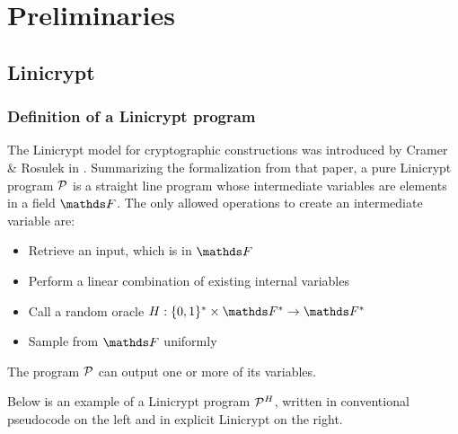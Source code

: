 \chapter{Preliminaries}

\section{Linicrypt}
\subsection{Definition of a Linicrypt program}

The Linicrypt model for cryptographic constructions was introduced by Cramer \& Rosulek in \cite{RC16}.
Summarizing the formalization from that paper,
a pure Linicrypt program $\P$ is a straight line program
whose intermediate variables are elements in a field $\F$.
The only allowed operations to create an intermediate variable are:
\begin{itemize}
  \item Retrieve an input, which is in $\F$
  \item Perform a linear combination of existing internal variables
  \item Call a random oracle $\H: \{0,1\}^* \times \F^* \to \F^*$
  \item Sample from $\F$ uniformly
\end{itemize}

The program $\P$ can output one or more of its variables.

Below is an example of a Linicrypt program $\P^\H$,
written in conventional pseudocode on the left and in explicit Linicrypt on the right. 

\begin{pchstack}[center, space=0.4cm]
  \pseudocode[valign=c]{\rightsquigarrow}
\end{pchstack}

